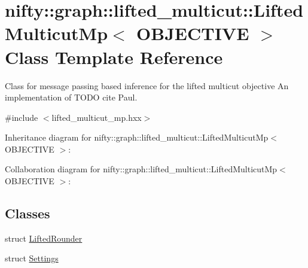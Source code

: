 \hypertarget{classnifty_1_1graph_1_1lifted__multicut_1_1LiftedMulticutMp}{}\section{nifty\+:\+:graph\+:\+:lifted\+\_\+multicut\+:\+:Lifted\+Multicut\+Mp$<$ O\+B\+J\+E\+C\+T\+I\+V\+E $>$ Class Template Reference}
\label{classnifty_1_1graph_1_1lifted__multicut_1_1LiftedMulticutMp}


Class for message passing based inference for the lifted multicut objective An implementation of T\+O\+D\+O cite Paul.  




{\ttfamily \#include $<$lifted\+\_\+multicut\+\_\+mp.\+hxx$>$}



Inheritance diagram for nifty\+:\+:graph\+:\+:lifted\+\_\+multicut\+:\+:Lifted\+Multicut\+Mp$<$ O\+B\+J\+E\+C\+T\+I\+V\+E $>$\+:


Collaboration diagram for nifty\+:\+:graph\+:\+:lifted\+\_\+multicut\+:\+:Lifted\+Multicut\+Mp$<$ O\+B\+J\+E\+C\+T\+I\+V\+E $>$\+:
\subsection*{Classes}
\begin{DoxyCompactItemize}
\item 
struct \hyperlink{structnifty_1_1graph_1_1lifted__multicut_1_1LiftedMulticutMp_1_1LiftedRounder}{Lifted\+Rounder}
\item 
struct \hyperlink{structnifty_1_1graph_1_1lifted__multicut_1_1LiftedMulticutMp_1_1Settings}{Settings}
\end{DoxyCompactItemize}
